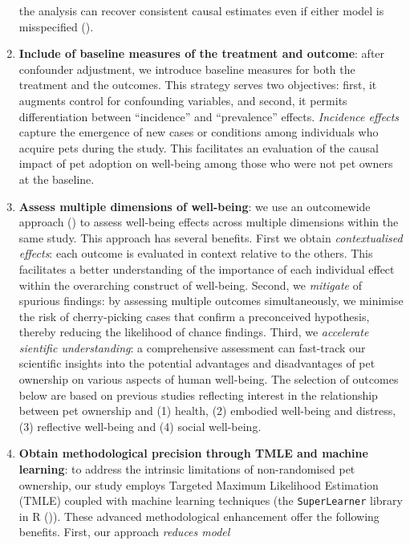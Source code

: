 \documentclass[
  singlecolumn]{article}
\begin{document}
\begin{enumerate}
  the analysis can recover consistent causal estimates even if either
  model is misspecified ().
\item
  \textbf{Include of baseline measures of the treatment and outcome}:
  after confounder adjustment, we introduce baseline measures for both
  the treatment and the outcomes. This strategy serves two objectives:
  first, it augments control for confounding variables, and second, it
  permits differentiation between ``incidence'' and ``prevalence''
  effects. \emph{Incidence effects} capture the emergence of new cases
  or conditions among individuals who acquire pets during the study.
  This facilitates an evaluation of the causal impact of pet adoption on
  well-being among those who were not pet owners at the baseline.
\item
  \textbf{Assess multiple dimensions of well-being}: we use an
  outcomewide approach () to assess well-being effects across multiple
  dimensions within the same study. This approach has several benefits.
  First we obtain \emph{contextualised effects}: each outcome is
  evaluated in context relative to the others. This facilitates a better
  understanding of the importance of each individual effect within the
  overarching construct of well-being. Second, we \emph{mitigate} of
  spurious findings: by assessing multiple outcomes simultaneously, we
  minimise the risk of cherry-picking cases that confirm a preconceived
  hypothesis, thereby reducing the likelihood of chance findings. Third,
  we \emph{accelerate sientific understanding}: a comprehensive
  assessment can fast-track our scientific insights into the potential
  advantages and disadvantages of pet ownership on various aspects of
  human well-being. The selection of outcomes below are based on
  previous studies reflecting interest in the relationship between pet
  ownership and (1) health, (2) embodied well-being and distress, (3)
  reflective well-being and (4) social well-being.
\item
  \textbf{Obtain methodological precision through TMLE and machine
  learning}: to address the intrinsic limitations of non-randomised pet
  ownership, our study employs Targeted Maximum Likelihood Estimation
  (TMLE) coupled with machine learning techniques (the
  \texttt{SuperLearner} library in R ()). These advanced methodological enhancement offer
  the following benefits. First, our approach \emph{reduces model
}
\end{enumerate}
\end{document}
